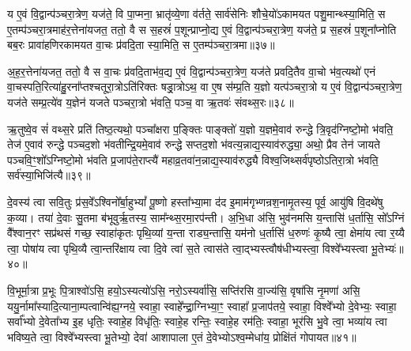 य ए॒वं वि॒द्वान्प॑ञ्चरा॒त्रेण॒ यज॑ते॒ वि पा॒प्मना॒ भ्रातृ॑व्ये॒णा व॑र्तते॒ सार्व॑सेनिः शौचे॒यो॑\-ऽकामयत पशु॒मान्थ्स्या॒मिति॒ स ए॒तम्प॑ञ्चरा॒त्रमाह॑र॒त्तेना॑यजत॒ ततो॒ वै स स॒हस्रं॑ प॒शून्प्राप्नो॒द्य ए॒वं वि॒द्वान्प॑ञ्चरा॒त्रेण॒ यज॑ते॒ प्र स॒हस्रं॑ प॒शूना᳚प्नोति बब॒रः प्रावा॑हणिरकामयत वा॒चः प्र॑वदि॒ता स्या॒मिति॒ स ए॒तम्प॑ञ्चरा॒त्रमा॥३७॥

अ॒ह॒र॒त्तेना॑यजत॒ ततो॒ वै स वा॒चः प्र॑वदि॒ताभ॑व॒द्य ए॒वं वि॒द्वान्प॑ञ्चरा॒त्रेण॒ यज॑ते प्रवदि॒तैव वा॒चो भ॑व॒त्यथो॑ एनं वा॒चस्पति॒रित्या॑हु॒रना᳚प्तश्चतूरा॒त्रो\-ऽति॑रिक्तः षड्रा॒त्रो\-ऽथ॒ वा ए॒ष स॑म्प्र॒ति य॒ज्ञो यत्प॑ञ्चरा॒त्रो य ए॒वं वि॒द्वान्प॑ञ्चरा॒त्रेण॒ यज॑ते सम्प्र॒त्ये॑व य॒ज्ञेन॑ यजते पञ्चरा॒त्रो भ॑वति॒ पञ्च॒ वा ऋ॒तवः॑ संवथ्स॒रः॥३८॥

ऋ॒तुष्वे॒व सं॑ वथ्स॒रे प्रति॑ तिष्ठ॒त्यथो॒ पञ्चा᳚क्षरा प॒ङ्क्तिः पाङ्क्तो॑ य॒ज्ञो य॒ज्ञमे॒वाव॑ रुन्द्धे त्रि॒वृद॑ग्निष्टो॒मो भ॑वति॒ तेज॑ ए॒वाव॑ रुन्द्धे पञ्चद॒शो भ॑वतीन्द्रि॒यमे॒वाव॑ रुन्द्धे सप्तद॒शो भ॑वत्य॒न्नाद्य॒स्याव॑रुद्ध्या॒ अथो॒ प्रैव तेन॑ जायते पञ्चवि॒ꣳ॒शो᳚\-ऽग्निष्टो॒मो भ॑वति प्र॒जाप॑ते॒राप्त्यै॑ महाव्र॒तवा॑न॒न्नाद्य॒स्याव॑रुद्ध्यै विश्व॒जिथ्सर्व॑पृष्ठो\-ऽतिरा॒त्रो भ॑वति॒ सर्व॑स्या॒भिजि॑त्यै॥३९॥

{\anuvakamend[{ते व्याव॑र्तन्त प्रवदि॒ता स्या॒मिति॒ स ए॒तम्प़॑ञ्चरा॒त्रमा सं॑ वथ्स॒रो॑\-ऽभिजि॑त्यै॥10॥}]}

दे॒वस्य॑ त्वा सवि॒तुः प्र॑स॒वे᳚\-ऽश्विनो᳚र्बा॒हु\-भ्यां᳚ पू॒ष्णो हस्ता᳚भ्या॒मा द॑द इ॒माम॑गृभ्णन्रश॒नामृ॒तस्य॒ पूर्व॒ आयु॑षि वि॒दथे॑षु क॒व्या। तया॑ दे॒वाः सु॒तमा ब॑भूवुर्\mbox{}ऋ॒तस्य॒ साम᳚न्थ्स॒रमा॒रप॑न्ती। अ॒भि॒धा अ॑सि॒ भुव॑नमसि य॒न्तासि॑ ध॒र्तासि॒ सो᳚\-ऽग्निं वै᳚श्वान॒रꣳ सप्र॑थसं गच्छ॒ स्वाहा॑कृतः पृथि॒व्यां य॒न्ता राड्य॒न्तासि॒ यम॑नो ध॒र्तासि॑ ध॒रुणः॑ कृ॒ष्यै त्वा॒ क्षेमा॑य त्वा र॒य्यै त्वा॒ पोषा॑य त्वा पृथि॒व्यै त्वा॒न्तरि॑क्षाय त्वा दि॒वे त्वा॑ स॒ते त्वास॑ते त्वा॒द्भ्यस्त्वौष॑धीभ्यस्त्वा॒ विश्वे᳚भ्यस्त्वा भू॒तेभ्यः॑॥४०॥

{\anuvakamend[{ध॒रुणः॒ प़ञ्च॑विꣳशतिश्च॥11॥}]}

वि॒भूर्मा॒त्रा प्र॒भूः पि॒त्राश्वो॑\-ऽसि॒ हयो॒\-ऽस्यत्यो॑\-ऽसि॒ नरो॒\-ऽस्यर्वा॑सि॒ सप्ति॑रसि वा॒ज्य॑सि॒ वृषा॑सि नृ॒मणा॑ असि॒ ययु॒र्नामा᳚स्यादि॒त्याना॒म्पत्वान्वि॑ह्य॒ग्नये॒ स्वाहा॒ स्वाहे᳚न्द्रा॒ग्निभ्या॒ꣳ॒ स्वाहा᳚ प्र॒जाप॑तये॒ स्वाहा॒ विश्वे᳚भ्यो दे॒वेभ्यः॒ स्वाहा॒ सर्वा᳚भ्यो दे॒वेता᳚भ्य इ॒ह धृतिः॒ स्वाहे॒ह विधृ॑तिः॒ स्वाहे॒ह रन्तिः॒ स्वाहे॒ह रम॑तिः॒ स्वाहा॒ भूर॑सि भु॒वे त्वा॒ भव्या॑य त्वा भविष्य॒ते त्वा॒ विश्वे᳚भ्यस्त्वा भू॒तेभ्यो॒ देवा॑ आशापाला ए॒तं दे॒वेभ्यो\-ऽश्व॒म्मेधा॑य॒ प्रोक्षि॑तं गोपायत॥४१॥

